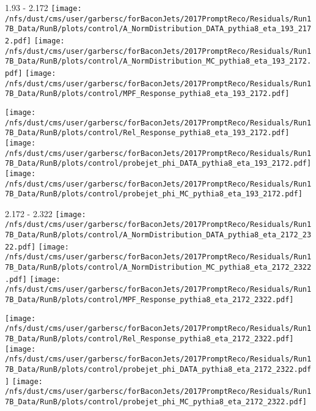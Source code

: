 \documentclass[t,compress]{beamer}
\begin{document}
\begin{frame}{1.93 - 2.172}
	\texttt{[image: /nfs/dust/cms/user/garbersc/forBaconJets/2017PromptReco/Residuals/Run17B\_Data/RunB/plots/control/A\_NormDistribution\_DATA\_pythia8\_eta\_193\_2172.pdf]}
	\texttt{[image: /nfs/dust/cms/user/garbersc/forBaconJets/2017PromptReco/Residuals/Run17B\_Data/RunB/plots/control/A\_NormDistribution\_MC\_pythia8\_eta\_193\_2172.pdf]}
	\texttt{[image: /nfs/dust/cms/user/garbersc/forBaconJets/2017PromptReco/Residuals/Run17B\_Data/RunB/plots/control/MPF\_Response\_pythia8\_eta\_193\_2172.pdf]}
\newline

	\texttt{[image: /nfs/dust/cms/user/garbersc/forBaconJets/2017PromptReco/Residuals/Run17B\_Data/RunB/plots/control/Rel\_Response\_pythia8\_eta\_193\_2172.pdf]}
	\texttt{[image: /nfs/dust/cms/user/garbersc/forBaconJets/2017PromptReco/Residuals/Run17B\_Data/RunB/plots/control/probejet\_phi\_DATA\_pythia8\_eta\_193\_2172.pdf]}
	\texttt{[image: /nfs/dust/cms/user/garbersc/forBaconJets/2017PromptReco/Residuals/Run17B\_Data/RunB/plots/control/probejet\_phi\_MC\_pythia8\_eta\_193\_2172.pdf]}
\end{frame}

\begin{frame}{2.172 - 2.322}
	\texttt{[image: /nfs/dust/cms/user/garbersc/forBaconJets/2017PromptReco/Residuals/Run17B\_Data/RunB/plots/control/A\_NormDistribution\_DATA\_pythia8\_eta\_2172\_2322.pdf]}
	\texttt{[image: /nfs/dust/cms/user/garbersc/forBaconJets/2017PromptReco/Residuals/Run17B\_Data/RunB/plots/control/A\_NormDistribution\_MC\_pythia8\_eta\_2172\_2322.pdf]}
	\texttt{[image: /nfs/dust/cms/user/garbersc/forBaconJets/2017PromptReco/Residuals/Run17B\_Data/RunB/plots/control/MPF\_Response\_pythia8\_eta\_2172\_2322.pdf]}
\newline

	\texttt{[image: /nfs/dust/cms/user/garbersc/forBaconJets/2017PromptReco/Residuals/Run17B\_Data/RunB/plots/control/Rel\_Response\_pythia8\_eta\_2172\_2322.pdf]}
	\texttt{[image: /nfs/dust/cms/user/garbersc/forBaconJets/2017PromptReco/Residuals/Run17B\_Data/RunB/plots/control/probejet\_phi\_DATA\_pythia8\_eta\_2172\_2322.pdf]}
	\texttt{[image: /nfs/dust/cms/user/garbersc/forBaconJets/2017PromptReco/Residuals/Run17B\_Data/RunB/plots/control/probejet\_phi\_MC\_pythia8\_eta\_2172\_2322.pdf]}
\end{frame}
\end{document}
